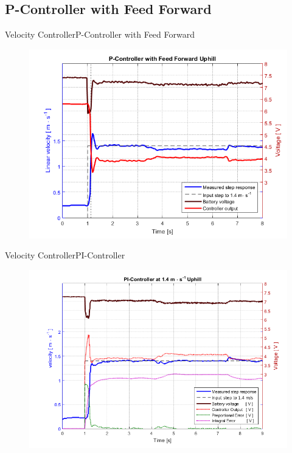 \subsection{P-Controller with Feed Forward}

\begin{frame}{Velocity Controller}{P-Controller with Feed Forward}

\begin{figure}[H]
	\centering
	\includegraphics[scale=0.55]{Pictures/hillPfeedForward.png}   
\end{figure}

\end{frame}


\begin{frame}{Velocity Controller}{PI-Controller}

\begin{figure}[H]
	\centering
	\includegraphics[scale=0.38]{Pictures/PIhill.png}   
\end{figure}

\end{frame}

